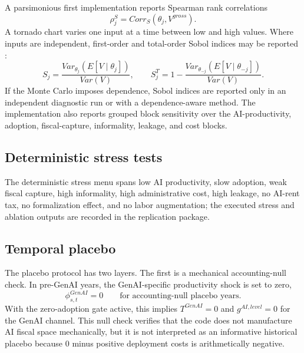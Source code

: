 \documentclass[11pt,a4paper]{article}
\begin{document}
A parsimonious first implementation reports Spearman rank correlations
\begin{equation}
    \rho^S_j=Corr_S(\theta_j,V^{gross}).
\end{equation}
A tornado chart varies one input at a time between low and high values. Where inputs are independent, first-order and total-order Sobol indices may be reported \citep{morris1991factorial,saltelli2008global,sobol2001global}:
\begin{equation}
    S_j=\frac{Var_{\theta_j}(E[V\mid\theta_j])}{Var(V)},
    \qquad
    S^T_j=1-\frac{Var_{\theta_{-j}}(E[V\mid\theta_{-j}])}{Var(V)}.
\end{equation}
If the Monte Carlo imposes dependence, Sobol indices are reported only in an independent diagnostic run or with a dependence-aware method.
The implementation also reports grouped block sensitivity over the AI-productivity, adoption, fiscal-capture, informality, leakage, and cost blocks.


\subsection{Deterministic stress tests}

The deterministic stress menu spans low AI productivity, slow adoption, weak fiscal capture, high informality, high administrative cost, high leakage, no AI-rent tax, no formalization effect, and no labor augmentation; the executed stress and ablation outputs are recorded in the replication package.

\subsection{Temporal placebo}

The placebo protocol has two layers. The first is a mechanical accounting-null check. In pre-GenAI years, the GenAI-specific productivity shock is set to zero,
\begin{equation}
    \phi^{GenAI}_{s,t}=0\qquad \text{for accounting-null placebo years.}
\end{equation}
With the zero-adoption gate active, this implies $T^{GenAI}=0$ and $g^{AI,level}=0$ for the GenAI channel. This null check verifies that the code does not manufacture AI fiscal space mechanically, but it is not interpreted as an informative historical placebo because $0$ minus positive deployment costs is arithmetically negative.
\end{document}
